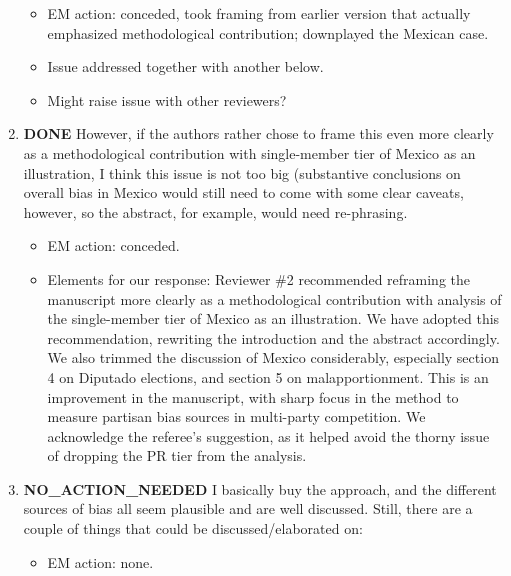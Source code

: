 \documentclass{article}
\begin{document}
\begin{enumerate}
\label{sec:orgheadline6}
\begin{itemize}
\item EM action: conceded, took framing from earlier version that actually emphasized methodological contribution; downplayed the Mexican case.
\item Issue addressed together with another below.
\item Might raise issue with other reviewers?
\end{itemize}
\item {\bfseries\sffamily DONE} However, if the authors rather chose to frame this even more clearly as a methodological contribution with single-member tier of Mexico as an illustration, I think this issue is not too big (substantive conclusions on overall bias in Mexico would still need to come with some clear caveats, however, so the abstract, for example, would need re-phrasing.
\label{sec:orgheadline7}
\begin{itemize}
\item EM action: conceded.
\item Elements for our response: Reviewer \#2 recommended reframing the manuscript more clearly as a methodological contribution with analysis of the single-member tier of Mexico as an illustration. We have adopted this recommendation, rewriting the introduction and the abstract accordingly. We also trimmed the discussion of Mexico considerably, especially section 4 on Diputado elections, and section 5 on malapportionment. This is an improvement in the manuscript, with sharp focus in the method to measure partisan bias sources in multi-party competition. We acknowledge the referee's suggestion, as it helped avoid the thorny issue of dropping the PR tier from the analysis.
\end{itemize}
\item {\bfseries\sffamily NO\_ACTION\_NEEDED} I basically buy the approach, and the different sources of bias all seem plausible and are well discussed. Still, there are a couple of things that could be discussed/elaborated on:
\label{sec:orgheadline8}
\begin{itemize}
\item EM action: none.
\end{itemize}

\end{enumerate}
\end{document}
